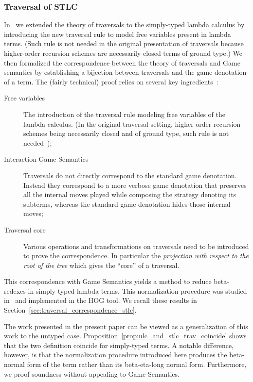 \documentclass{article}
\theoremstyle{definition}
\begin{document}
\subsubsection{Traversal of STLC}

In~\cite{BlumPhd} we extended the theory of traversals to the simply-typed lambda calculus by introducing the new traversal rule  to model free variables present in lambda terms. (Such rule is not needed in the original presentation of traversals because higher-order recursion schemes are necessarily closed terms of ground type\cite{Ong2006}.) We then formalized the correspondence between the theory of traversals and Game semantics by establishing a bijection between traversals and the game denotation of a term. The (fairly technical) proof relies on several key ingredients~\cite{BlumPhd}:
\begin{description}
  \item[Free variables] The introduction of the traversal rule  modeling  free variables of the lambda calculus. (In the original traversal setting, higher-order recursion schemes being necessarily closed and of ground type, such rule is not needed~\cite{Ong2006});
  \item[Interaction Game Semantics] Traversals do not directly correspond to the standard game denotation. Instead they correspond to a more verbose game denotation that preserves all the internal moves played while composing the strategy denoting its subterms, whereas the standard game denotation hides those internal moves;
  \item[Traversal core] Various operations and transformations on traversals need to be introduced to prove the correspondence. In particular the \emph{projection with respect to the root of the tree} which gives the ``core'' of a traversal.
\end{description}

 This correspondence with Game Semantics yields a method to reduce beta-redexes in simply-typed lambda-terms. This normalization procedure was studied in~\cite{BlumPhd,BlumGalop2008,Blum-HogTool,Ong-NormByTrav2015} and implemented in the HOG tool\cite{BlumGalop2008, BlumPhd}. We recall these results in Section~\ref{sec:traversal_correspondence_stlc}.

The work presented in the present paper can be viewed as a generalization of this work to the untyped case. Proposition~\ref{prop:ulc_and_stlc_trav_coincide} shows that the two definition coincide for simply-typed terms.
A notable difference, however, is that the normalization procedure introduced here produces the beta-normal form of the term rather than its beta-eta-long normal form. Furthermore, we proof soundness without appealing to Game Semantics.
\end{document}
